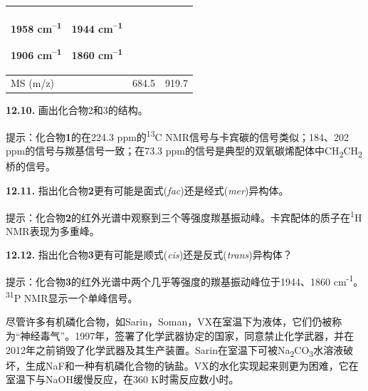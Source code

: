 \begin{longtable}[]{@{}llll@{}}
\begin{minipage}[t]{0.22\columnwidth}
		1958 cm\textsuperscript{--1}
		
		1906 cm\textsuperscript{--1}\strut
	\end{minipage} & \begin{minipage}[t]{0.22\columnwidth}\raggedright
		1944 cm\textsuperscript{--1}
		
		1860 cm\textsuperscript{--1}\strut
	\end{minipage}\tabularnewline\midrule
	MS (m/z) & & 684.5 & 919.7\tabularnewline
	\bottomrule
\end{longtable}


\noindent\textbf{12.10.} 画出化合物2和3的结构。

\noindent 提示：化合物\textbf{1}的在224.3 ppm的\textsuperscript{13}C
NMR信号与卡宾碳的信号类似；184、202 ppm的信号与羰基信号一致；在73.3
ppm的信号是典型的双氧碳烯配体中CH\textsubscript{2}CH\textsubscript{2}桥的信号。

\noindent\textbf{12.11.}
指出化合物\textbf{2}更有可能是面式(\emph{fac})还是经式(\emph{mer})异构体。

\noindent 提示：化合物\textbf{2}的红外光谱中观察到三个等强度羰基振动峰。卡宾配体的质子在\textsuperscript{1}H
NMR表现为多重峰。

\noindent\textbf{12.12.}
指出化合物\textbf{3}更有可能是顺式(\emph{cis})还是反式(\emph{trans})异构体？

\noindent 提示：化合物\textbf{3}的红外光谱中两个几乎等强度的羰基振动峰位于1944、1860
cm\textsuperscript{-1}。\textsuperscript{31}P NMR显示一个单峰信号。

尽管许多有机磷化合物，如Sarin，Soman，VX在室温下为液体，它们仍被称为``神经毒气''。1997年，签署了化学武器协定的国家，同意禁止化学武器，并在2012年之前销毁了化学武器及其生产装置。Sarin在室温下可被Na\textsubscript{2}CO\textsubscript{3}水溶液破坏，生成NaF和一种有机磷化合物的钠盐。VX的水化实现起来则更为困难，它在室温下与NaOH缓慢反应，在360
K时需反应数小时。

